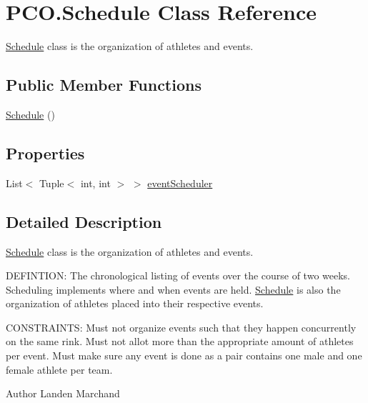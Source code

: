 \hypertarget{classPCO_1_1Schedule}{\section{P\+C\+O.\+Schedule Class Reference}
\label{classPCO_1_1Schedule}
}


\hyperlink{classPCO_1_1Schedule}{Schedule} class is the organization of athletes and events.  


\subsection*{Public Member Functions}
\begin{DoxyCompactItemize}
\item 
\hyperlink{classPCO_1_1Schedule_ad35bec6c65e855eeb89793a4cafd8e6c}{Schedule} ()
\end{DoxyCompactItemize}
\subsection*{Properties}
\begin{DoxyCompactItemize}
\item 
List$<$ Tuple$<$ int, int $>$ $>$ \hyperlink{classPCO_1_1Schedule_a2b8369272a80dc96ce6c334e0694a6e8}{event\+Scheduler}
\end{DoxyCompactItemize}


\subsection{Detailed Description}
\hyperlink{classPCO_1_1Schedule}{Schedule} class is the organization of athletes and events. 

D\+E\+F\+I\+N\+T\+I\+O\+N\+: The chronological listing of events over the course of two weeks. Scheduling implements where and when events are held. \hyperlink{classPCO_1_1Schedule}{Schedule} is also the organization of athletes placed into their respective events.

C\+O\+N\+S\+T\+R\+A\+I\+N\+T\+S\+: Must not organize events such that they happen concurrently on the same rink. Must not allot more than the appropriate amount of athletes per event. Must make sure any event is done as a pair contains one male and one female athlete per team.\begin{DoxyAuthor}{Author}
Landen Marchand 
\end{DoxyAuthor}


